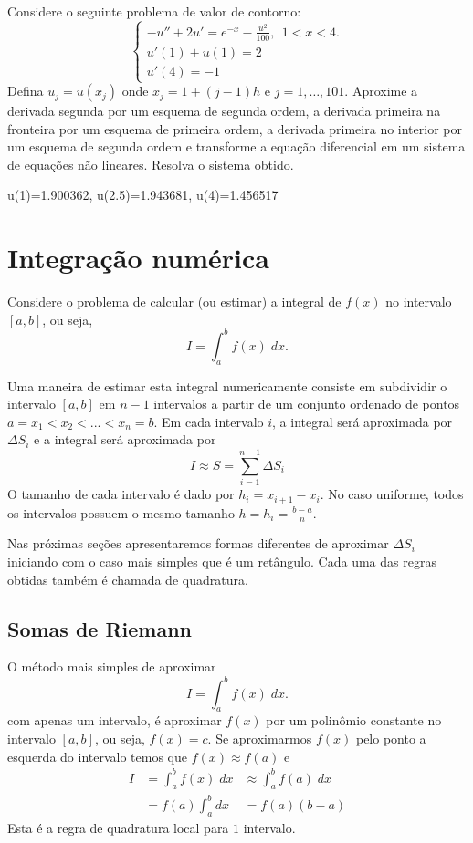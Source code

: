 \begin{Exercise} Considere o seguinte problema de valor de contorno:
$$\left\{\begin{array}{l}-u''+2u'=e^{-x}- \frac{u^2}{100},~~ 1<x<4.\\
u'(1)+u(1)=2\\
u'(4)=-1\end{array}
\right.
$$
Defina $u_j=u(x_j)$ onde $x_j=1+{(j-1)}{h}$ e $j=1,\ldots,101$. Aproxime a derivada segunda por um esquema de segunda ordem, a derivada primeira na fronteira por um esquema de primeira ordem, a derivada primeira no interior por um esquema de segunda ordem e transforme a equação diferencial em um sistema de equações não lineares. Resolva o sistema  obtido.
\end{Exercise}
\begin{Answer}
  \begin{tiny}
u(1)=1.900362, u(2.5)=1.943681, u(4)=1.456517    
  \end{tiny}
\end{Answer}

\section{Integração numérica}

Considere o problema de calcular (ou estimar) a integral de $f(x)$ no intervalo $[a,b]$, ou seja,
$$
 I = \int_a^b f(x) \;dx.
$$

Uma maneira de estimar esta integral numericamente consiste em subdividir o intervalo $[a,b]$ em $n-1$ intervalos a partir de um conjunto ordenado de pontos $a=x_1<x_2<...<x_n=b$. 
Em cada intervalo $i$, a integral será aproximada por $\Delta S_i$ e a integral será aproximada por 
$$
 I \approx S = \sum_{i=1}^{n-1} \Delta S_i
$$
O tamanho de cada intervalo é dado por $h_i=x_{i+1}-x_i$. No caso uniforme, todos os intervalos possuem o mesmo tamanho $h=h_i=\frac{b-a}{n}$.

Nas próximas seções apresentaremos formas diferentes de aproximar $\Delta S_i$ iniciando com o caso mais simples que é um retângulo. Cada uma das regras obtidas também é chamada de quadratura.


\subsection{Somas de Riemann}
O método mais simples de aproximar 
$$
 I = \int_a^b f(x) \;dx.
$$
com apenas um intervalo, é aproximar $f(x)$ por um polinômio constante no intervalo $[a,b]$, ou seja, $f(x)=c$. Se aproximarmos $f(x)$ pelo ponto a esquerda do intervalo temos que $f(x)\approx f(a)$ e
\begin{eqnarray}
 I &= \int_a^b f(x) \;dx 
   &\approx \int_a^b f(a) \;dx \\
   &= f(a) \int_a^b dx 
   &= f(a) (b-a)
\end{eqnarray}
Esta é a regra de quadratura local para $1$ intervalo.

